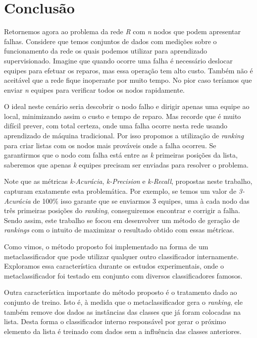 \chapter{Conclusão}

Retornemos agora ao problema da rede \textit{R} com \textit{n} nodos que podem apresentar falhas.
Considere que temos conjuntos de dados com medições sobre o funcionamento da rede os quais podemos utilizar para aprendizado supervisionado.
Imagine que quando ocorre uma falha é necessário deslocar equipes para efetuar os reparos, mas essa operação tem alto custo.
Também não é aceitável que a rede fique inoperante por muito tempo.
No pior caso teríamos que enviar \textit{n} equipes para verificar todos os nodos rapidamente.

O ideal neste cenário seria descobrir o nodo falho e dirigir apenas uma equipe ao local, minimizando assim o custo e tempo de reparo.
Mas recorde que é muito difícil prever, com total certeza, onde uma falha ocorre nesta rede usando aprendizado de máquina tradicional.
Por isso propomos a utilização de \textit{ranking} para criar listas com os nodos mais prováveis onde a falha ocorreu.
Se garantirmos que o nodo com falha está entre as \textit{k} primeiras posições da lista, saberemos que apenas \textit{k} equipes precisam ser enviadas para resolver o problema.

Note que as métricas \textit{k-Acurácia}, \textit{k-Precision} e \textit{k-Recall}, propostas neste trabalho, capturam exatamente esta problemática.
Por exemplo, se temos um valor de \textit{3-Acurácia} de 100\% isso garante que se enviarmos 3 equipes, uma à cada  nodo das três primeiras posições do \textit{ranking}, conseguiremos encontrar e corrigir a falha.
Sendo assim, este trabalho se focou em desenvolver um método de geração de \textit{rankings} com o intuito de maximizar o resultado obtido com essas métricas.

Como vimos, o método proposto foi implementado na forma de um metaclassificador que pode utilizar qualquer outro classificador internamente.
Exploramos essa característica durante os estudos experimentais, onde o metaclassificador foi testado em conjunto com diversos classificadores famosos.

Outra característica importante do método proposto é o tratamento dado ao conjunto de treino.
Isto é, à medida que o metaclassificador gera o \textit{ranking}, ele também remove dos dados as instâncias das classes que já foram colocadas na lista.
Desta forma o classificador interno responsável por gerar o próximo elemento da lista é treinado com dados sem a influência das classes anteriores.

